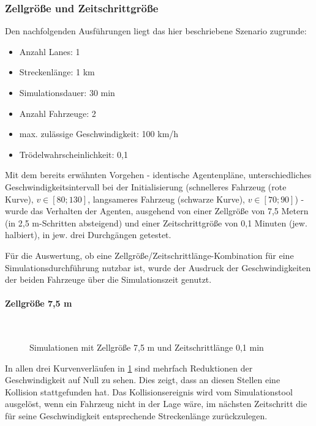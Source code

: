 \subsubsection{Zellgröße und Zeitschrittgröße}
\label{sec:cellsize-timesteplength}

Den nachfolgenden Ausführungen liegt das hier beschriebene Szenario zugrunde:
\begin{itemize}
\itemsep0em
	\item Anzahl Lanes: 1
	\item Streckenlänge: 1 km
	\item Simulationsdauer: 30 min
	\item Anzahl Fahrzeuge: 2
	\item max. zulässige Geschwindigkeit: 100 km/h
	\item Trödelwahrscheinlichkeit: 0,1
\end{itemize}
Mit dem bereits erwähnten Vorgehen - identische Agentenpläne, unterschiedliches Geschwindigkeitsintervall bei der Initialisierung (schnelleres Fahrzeug (rote Kurve), $ v \in [80; 130] $, langsameres Fahrzeug (schwarze Kurve), $ v \in [70; 90] $) - wurde das Verhalten der Agenten, ausgehend von einer Zellgröße von 7,5 Metern (in 2,5 m-Schritten absteigend) und einer Zeitschrittgröße von 0,1 Minuten (jew. halbiert), in jew. drei Durchgängen getestet.

Für die Auswertung, ob eine Zellgröße/Zeitschrittlänge-Kombination für eine Simulationsdurchführung nutzbar ist, wurde der Ausdruck der Geschwindigkeiten der beiden Fahrzeuge über die Simulationszeit genutzt.


\paragraph*{Zellgröße 7,5 m}
\hfill \\

\begin{figure}[hptb]
  \centering 
   \qquad 
   \qquad 
  \caption{Simulationen mit Zellgröße 7,5 m und Zeitschrittlänge 0,1 min} 
  \label{figure:run1-3}
\end{figure}

In allen drei Kurvenverläufen in \cref{figure:run1-3} sind mehrfach Reduktionen der Geschwindigkeit auf Null zu sehen. 
Dies zeigt, dass an diesen Stellen eine Kollision stattgefunden hat. Das Kollisionsereignis wird vom Simulationstool ausgelöst, wenn ein Fahrzeug nicht in der Lage wäre, im nächsten Zeitschritt die für seine Geschwindigkeit entsprechende Streckenlänge zurückzulegen.

